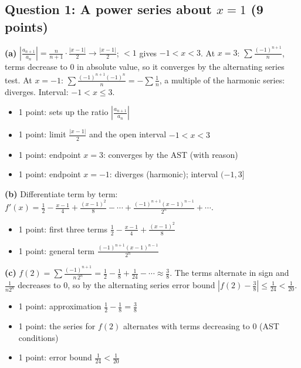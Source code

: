 \documentclass{apcalc}
\begin{document}
\subsection*{Question 1: A power series about $x=1$ (9 points)}
\textbf{(a)} $\left|\frac{a_{n+1}}{a_n}\right|=\frac{n}{n+1}\cdot\frac{|x-1|}{2}\to\frac{|x-1|}{2}$; $<1$ gives $-1<x<3$. At $x=3$: $\sum\frac{(-1)^{n+1}}{n}$, terms decrease to 0 in absolute value, so it converges by the alternating series test. At $x=-1$: $\sum\frac{(-1)^{n+1}(-1)^n}{n}=-\sum\frac1n$, a multiple of the harmonic series: diverges. Interval: $-1<x\le3$.
\begin{itemize}[leftmargin=1.6em,itemsep=0pt]
\item 1 point: sets up the ratio $\left|\frac{a_{n+1}}{a_n}\right|$
\item 1 point: limit $\frac{|x-1|}{2}$ and the open interval $-1<x<3$
\item 1 point: endpoint $x=3$: converges by the AST (with reason)
\item 1 point: endpoint $x=-1$: diverges (harmonic); interval $(-1,3]$
\end{itemize}
\textbf{(b)} Differentiate term by term: $f'(x)=\frac12-\frac{x-1}{4}+\frac{(x-1)^2}{8}-\cdots+\frac{(-1)^{n+1}(x-1)^{n-1}}{2^n}+\cdots$.
\begin{itemize}[leftmargin=1.6em,itemsep=0pt]
\item 1 point: first three terms $\frac12-\frac{x-1}{4}+\frac{(x-1)^2}{8}$
\item 1 point: general term $\frac{(-1)^{n+1}(x-1)^{n-1}}{2^n}$
\end{itemize}
\textbf{(c)} $f(2)=\sum\frac{(-1)^{n+1}}{n\,2^n}=\frac12-\frac18+\frac1{24}-\cdots\approx\frac38$. The terms alternate in sign and $\frac{1}{n2^n}$ decreases to 0, so by the alternating series error bound $\left|f(2)-\frac38\right|\le\frac{1}{24}<\frac{1}{20}$.
\begin{itemize}[leftmargin=1.6em,itemsep=0pt]
\item 1 point: approximation $\frac12-\frac18=\frac38$
\item 1 point: the series for $f(2)$ alternates with terms decreasing to 0 (AST conditions)
\item 1 point: error bound $\frac{1}{24}<\frac1{20}$
\end{itemize}
\end{document}
